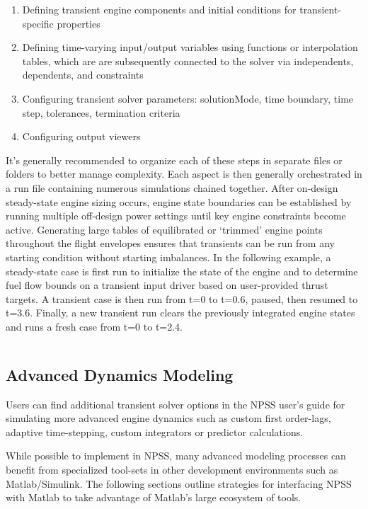 \documentclass[heading.tex]{subfiles}
\begin{document}
\begin{enumerate}
\item Defining transient engine components and initial conditions for transient-specific properties
\item Defining time-varying input/output variables using functions or interpolation tables,
which are are subsequently connected to the solver via independents, dependents, and constraints
\item Configuring transient solver parameters: solutionMode, time boundary, time step, tolerances, termination criteria
\item Configuring output viewers
\end{enumerate}

It's generally recommended to organize each of these steps in separate files or folders to better manage complexity.
Each aspect is then generally orchestrated in a run file containing numerous simulations chained together. 
After on-design steady-state engine sizing occurs, engine state boundaries can be established by running multiple
off-design power settings until key engine constraints become active.
Generating large tables of equilibrated or `trimmed' engine points
throughout the flight envelopes ensures that transients can be run from any starting condition without
starting imbalances.
In the following example, a steady-state case is first run to initialize the state of the engine and
to determine fuel flow bounds on a transient input driver based on user-provided thrust targets.
A transient case is then run from t=0 to t=0.6, paused, then resumed to t=3.6.
Finally, a new transient run clears the previously integrated engine states and runs a fresh case from t=0 to t=2.4.

 \begin{adjustwidth}{1cm}{-1cm}
 \inputminted[]{c++}{code/transientRun}
 \end{adjustwidth} 

\subsection{Advanced Dynamics Modeling}

Users can find additional transient solver options in the NPSS user's guide
\cite[chap.~18]{NPSS} for simulating
more advanced engine dynamics such as custom first order-lags,
adaptive time-stepping, custom integrators or predictor calculations.

While possible to implement in NPSS, many advanced modeling processes can benefit
from specialized tool-sets in other development environments such as Matlab/Simulink.
The following sections outline strategies for interfacing NPSS
with Matlab to take advantage of Matlab's large ecosystem of tools.
\end{document}
